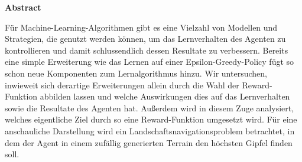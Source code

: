 %
%
\vspace*{2cm}

\begin{center}
    \textbf{Abstract}
\end{center}

\vspace*{1cm}


\noindent Für Machine-Learning-Algorithmen gibt es eine Vielzahl von Modellen und Strategien, die genutzt werden können, um das Lernverhalten des Agenten zu kontrollieren und damit schlussendlich dessen Resultate zu verbessern. Bereits eine simple Erweiterung wie das Lernen auf einer Epsilon-Greedy-Policy fügt so schon neue Komponenten zum Lernalgorithmus hinzu. Wir untersuchen, inwieweit sich derartige Erweiterungen allein durch die Wahl der Reward-Funktion abbilden lassen und welche Auswirkungen dies auf das Lernverhalten sowie die Resultate des Agenten hat. Außerdem wird in diesem Zuge analysiert, welches eigentliche Ziel durch so eine Reward-Funktion umgesetzt wird. Für eine anschauliche Darstellung wird ein Landschaftsnavigationsproblem betrachtet, in dem der Agent in einem zufällig generierten Terrain den höchsten Gipfel finden soll.

